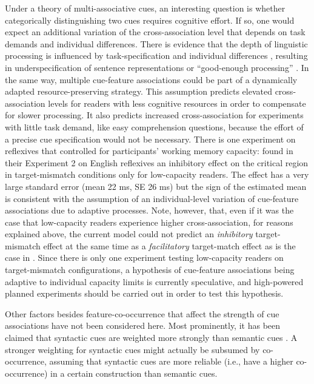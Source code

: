\documentclass{cambridge7A}\usepackage[]{graphicx}\usepackage[]{color}
\begin{document}
Under a theory of multi-associative cues, an interesting question is whether categorically distinguishing two cues requires cognitive effort. If so, one would expect an additional variation of the cross-association level that depends on task demands and individual differences.
There is evidence that the depth of linguistic processing is influenced by task-specification \citep{SwetsDesmetClifton2008,LogacevVasishth2015} and individual differences \citep{Traxler2007,MalsburgVasishth2013,NicenboimEtAlFrontiers2016Capacity}, resulting in underspecification of sentence representations or ``good-enough processing'' \citep{FerreiraFerraroBailey2002}.
In the same way, multiple cue-feature associations could be part of a dynamically adapted resource-preserving strategy. 
This assumption predicts elevated cross-association levels for readers with less cognitive resources in order to compensate for slower processing. It also predicts increased cross-association for experiments with little task demand, like easy comprehension questions, because the effort of a precise cue specification would not be necessary.
There is one experiment on reflexives that controlled for participants'  working memory capacity: \cite{CunningsFelser2013} found in their Experiment 2 on English reflexives an inhibitory effect on the critical region in target-mismatch conditions only for low-capacity readers. The effect has a very large standard error (mean 22 ms, SE 26 ms) but the sign of the estimated mean is consistent with the assumption of an individual-level variation of cue-feature associations due to adaptive processes. 
Note, however, that, even if it was the case that low-capacity readers experience higher cross-association, for reasons explained above, the current model could not predict an \textit{inhibitory} target-mismatch effect at the same time as a \textit{facilitatory} target-match effect as is the case in \cite{CunningsFelser2013}.
Since there is only one experiment testing low-capacity readers on target-mismatch configurations, a hypothesis of cue-feature associations being adaptive to individual capacity limits is currently speculative, and high-powered planned experiments should be carried out in order to test this hypothesis.

Other factors besides feature-co-occurrence that affect the strength of cue associations have not been considered here.
Most prominently, it has been claimed that syntactic cues are weighted more strongly than semantic cues  \citep[e.g.,][]{Nicol1988, Sturt2003,VanDyke2007,VanDykeMcElree2011}. 
A stronger weighting for syntactic cues might actually be subsumed by co-occurrence, assuming that syntactic cues are more reliable (i.e., have a higher co-occurrence) in a certain construction than semantic cues.
\end{document}
